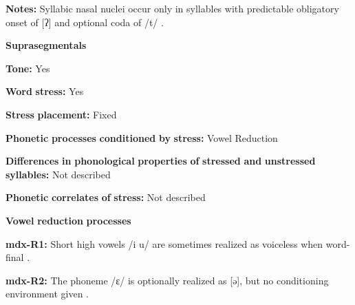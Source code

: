 \begin{styleBody}
\textbf{Notes:} Syllabic nasal nuclei occur only in syllables with predictable obligatory onset of [ʔ] and optional coda of /t/ \citep[41]{Beachy2005}.
\end{styleBody}

\begin{styleBody}
\textbf{Suprasegmentals}
\end{styleBody}

\begin{styleBody}
\textbf{Tone:} Yes
\end{styleBody}

\begin{styleBody}
\textbf{Word} \textbf{stress:} Yes
\end{styleBody}

\begin{styleBody}
\textbf{Stress} \textbf{placement:} Fixed
\end{styleBody}

\begin{styleBody}
\textbf{Phonetic} \textbf{processes} \textbf{conditioned} \textbf{by} \textbf{stress:} Vowel Reduction
\end{styleBody}

\begin{styleBody}
\textbf{Differences} \textbf{in} \textbf{phonological} \textbf{properties} \textbf{of} \textbf{stressed} \textbf{and} \textbf{unstressed} \textbf{syllables:} Not described
\end{styleBody}

\begin{styleBody}
\textbf{Phonetic} \textbf{correlates} \textbf{of} \textbf{stress:} Not described
\end{styleBody}

\begin{styleBody}
\textbf{Vowel} \textbf{reduction} \textbf{processes}
\end{styleBody}

\begin{styleBody}
\textbf{mdx-R1:} Short high vowels /i u/ are sometimes realized as voiceless when word-final \citep[35-6]{Beachy2005}.
\end{styleBody}

\begin{styleBody}
\textbf{mdx-R2:} The phoneme /ɛ/ is optionally realized as [ə], but no conditioning environment given \citep[37]{Beachy2005}.
\end{styleBody}

